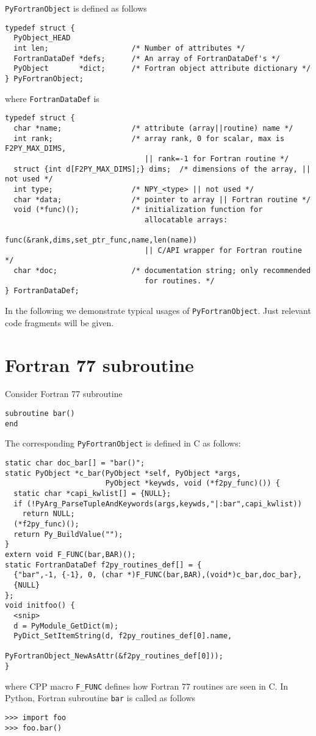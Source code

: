 \documentclass{article}
\begin{document}
\texttt{PyFortranObject} is defined as follows
\begin{verbatim}
typedef struct {
  PyObject_HEAD
  int len;                   /* Number of attributes */
  FortranDataDef *defs;      /* An array of FortranDataDef's */ 
  PyObject       *dict;      /* Fortran object attribute dictionary */
} PyFortranObject;
\end{verbatim}
where \texttt{FortranDataDef} is
\begin{verbatim}
typedef struct {
  char *name;                /* attribute (array||routine) name */
  int rank;                  /* array rank, 0 for scalar, max is F2PY_MAX_DIMS,
                                || rank=-1 for Fortran routine */
  struct {int d[F2PY_MAX_DIMS];} dims;  /* dimensions of the array, || not used */
  int type;                  /* NPY_<type> || not used */
  char *data;                /* pointer to array || Fortran routine */
  void (*func)();            /* initialization function for
                                allocatable arrays:
                                func(&rank,dims,set_ptr_func,name,len(name))
                                || C/API wrapper for Fortran routine */
  char *doc;                 /* documentation string; only recommended
                                for routines. */
} FortranDataDef;
\end{verbatim}
In the following we demonstrate typical usages of
\texttt{PyFortranObject}. Just relevant code fragments will be given.


\section{Fortran 77 subroutine}
\label{sec:f77subrout}

Consider Fortran 77 subroutine
\begin{verbatim}
subroutine bar()
end
\end{verbatim}
The corresponding \texttt{PyFortranObject} is defined in C as follows:
\begin{verbatim}
static char doc_bar[] = "bar()";
static PyObject *c_bar(PyObject *self, PyObject *args,
                       PyObject *keywds, void (*f2py_func)()) {
  static char *capi_kwlist[] = {NULL};
  if (!PyArg_ParseTupleAndKeywords(args,keywds,"|:bar",capi_kwlist))
    return NULL;
  (*f2py_func)();
  return Py_BuildValue("");
}
extern void F_FUNC(bar,BAR)();
static FortranDataDef f2py_routines_def[] = {
  {"bar",-1, {-1}, 0, (char *)F_FUNC(bar,BAR),(void*)c_bar,doc_bar},
  {NULL}
};
void initfoo() {
  <snip>
  d = PyModule_GetDict(m);
  PyDict_SetItemString(d, f2py_routines_def[0].name,
                       PyFortranObject_NewAsAttr(&f2py_routines_def[0]));
}
\end{verbatim}
where CPP macro \texttt{F\_FUNC} defines how Fortran 77 routines are
seen in C.
In Python, Fortran subroutine \texttt{bar} is called as follows
\begin{verbatim}
>>> import foo
>>> foo.bar()
\end{verbatim}
\end{document}

